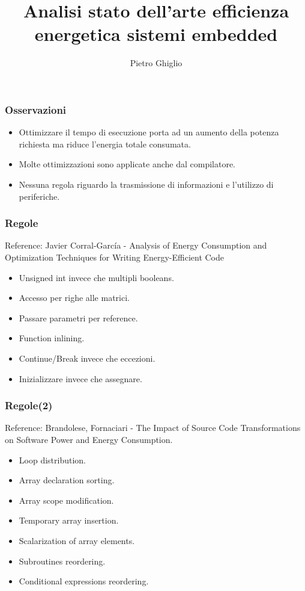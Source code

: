\documentclass{beamer}
\title{Analisi stato dell'arte efficienza energetica sistemi embedded}
\author{Pietro Ghiglio}
\begin{document}
\titlepage

\begin{frame}
\frametitle{Osservazioni}
\begin{itemize}
\item Ottimizzare il tempo di esecuzione porta ad un aumento della potenza richiesta ma riduce l'energia totale consumata.
\item Molte ottimizzazioni sono applicate anche dal compilatore.
\item Nessuna regola riguardo la trasmissione di informazioni e l'utilizzo di periferiche.
\end{itemize}
\end{frame}

\begin{frame}
\frametitle{Regole}
Reference: Javier Corral-García - Analysis of Energy Consumption and Optimization
Techniques for Writing Energy-Efficient Code
\begin{itemize}
\item Unsigned int invece che multipli booleans.
\item Accesso per righe alle matrici.
\item Passare parametri per reference.
\item Function inlining.
\item Continue/Break invece che eccezioni.
\item Inizializzare invece che assegnare.
\end{itemize}
\end{frame}

\begin{frame}
\frametitle{Regole(2)}
Reference: Brandolese, Fornaciari - The Impact of Source Code Transformations on Software Power and Energy Consumption.
\begin{itemize}
\item Loop distribution.
\item Array declaration sorting.
\item Array scope modification.
\item Temporary array insertion.
\item Scalarization of array elements.
\item Subroutines reordering.
\item Conditional expressions reordering.
\end{itemize}
\end{frame}
\end{document}
